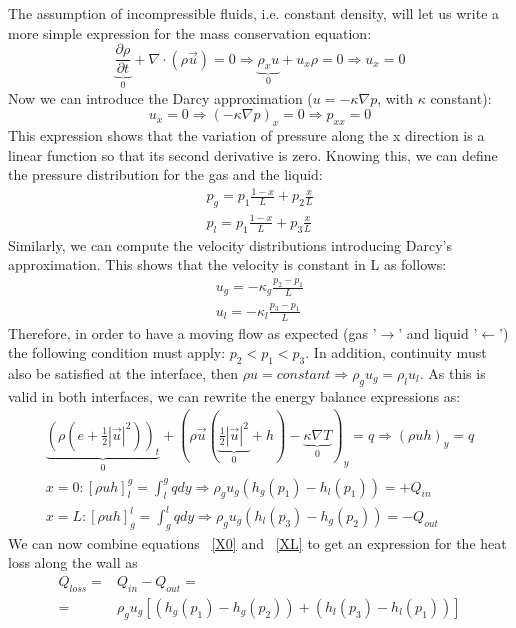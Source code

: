 \documentclass{article}
\begin{document}
The assumption of incompressible fluids, i.e. constant density, will let us write a more simple expression for the mass conservation equation:
\begin{equation}
\underbrace{\dfrac{\partial \rho}{\partial t}}_\text{0} + \nabla \cdot (\rho \vec{u})=0\Rightarrow \underbrace{\rho_xu}_\text{0}+u_x\rho=0\Rightarrow u_x=0
\end{equation}
Now we can introduce the Darcy approximation ($u=-\kappa\nabla p$, with $\kappa$ constant):
\begin{equation}
u_x=0\Rightarrow\left(-\kappa\nabla p \right)_x=0\Rightarrow p_{xx}=0
\end{equation}
This expression shows that the variation of pressure along the x direction is a linear function so that its second derivative is zero. Knowing this, we can define the pressure distribution for the gas and the liquid:
\begin{eqnarray}
\label{Pg}
p_g=p_1\frac{1-x}{L}+p_2\frac{x}{L}\\
\label{Pl}
p_l=p_1\frac{1-x}{L}+p_3\frac{x}{L}
\end{eqnarray}
Similarly, we can compute the velocity distributions introducing Darcy's approximation. This shows that the velocity is constant in L as follows:
\begin{eqnarray}
\label{Ug}
u_g=-\kappa_g\frac{p_2-p_1}{L}\\
\label{Ul}
u_l=-\kappa_l\frac{p_3-p_1}{L}
\end{eqnarray}
Therefore, in order to have a moving flow as expected (gas '$\rightarrow$' and liquid '$\leftarrow$') the following condition must apply:  $p_2<p_1<p_3$. In addition, continuity must also be satisfied at the interface, then $\rho u=constant\Rightarrow\rho_gu_g=\rho_lu_l$. As this is valid in both interfaces, we can rewrite the energy balance expressions as:
\begin{align}
\label{gen}
\underbrace{(\rho(e+\frac{1}{2}|\vec{u}|^2))_t}_\text{0} + (\rho\vec{u}(\underbrace{\frac{1}{2}|\vec{u}|^2}_\text{0}+h)-\underbrace{\kappa\nabla T}_\text{0})_y=q\Rightarrow(\rho uh)_y=q\\
\label{X0}
x=0: \left[\rho uh\right]^g_l=\int_l^gqdy\Rightarrow\rho_gu_g(h_g(p_1)-h_l(p_1))=+Q_{in}\\
\label{XL}
x=L: \left[\rho uh\right]^l_g=\int_g^lqdy\Rightarrow\rho_gu_g(h_l(p_3)-h_g(p_2))=-Q_{out}
\end{align}
We can now combine {equations ~\ref{X0} and ~\ref{XL}} to get an expression for the heat loss along the wall as 
\begin{align}
    Q_{loss}=&Q_{in}-Q_{out}=\nonumber\\
   =&\rho_gu_g\left[(h_g(p_1)-h_g(p_2))+(h_l(p_3)-h_l(p_1))\right]
\end{align}
\end{document}
